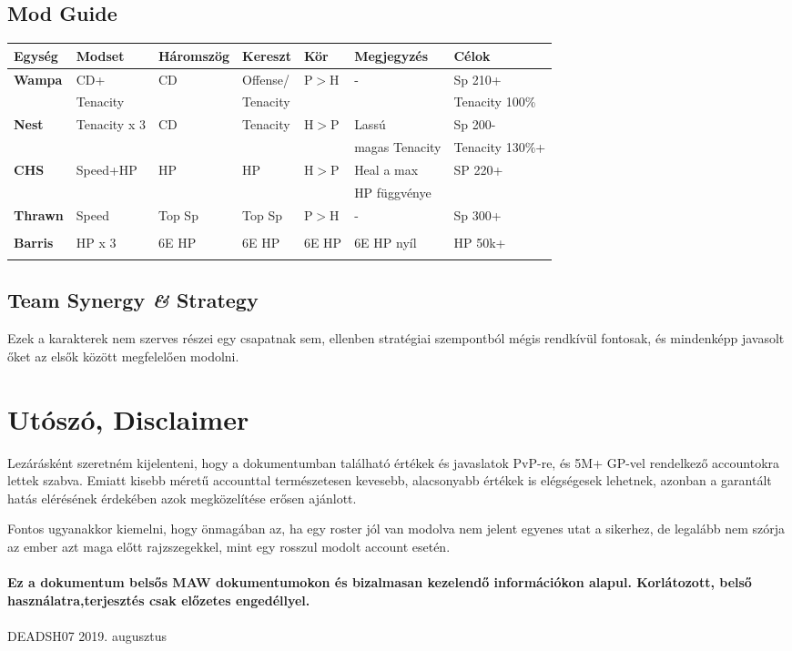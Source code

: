 \documentclass[11pt]{report}
\begin{document}
\section{Mod Guide}
\begin{center}
    \begin{tabular}{|l | l | l | l | l | l | l |}
        \hline
        Egység & Modset & Háromszög & Kereszt & Kör & Megjegyzés & Célok\\ \hline
        \textbf{Wampa} & CD+ & CD & Offense/ & P$>$H & - & Sp 210+\\
        & Tenacity &  & Tenacity &  &  & Tenacity 100\%\\ \hline
        \textbf{Nest} & Tenacity x 3 & CD & Tenacity & H$>$P & Lassú & Sp 200-\\
        &  &  &  &  & magas Tenacity & Tenacity 130\%+\\ \hline
        \textbf{CHS} & Speed+HP & HP & HP & H$>$P & Heal a max & SP 220+\\
        &  &  &  &  & HP függvénye & \\ \hline
        \textbf{Thrawn} & Speed & Top Sp & Top Sp & P$>$H & - & Sp 300+\\
        &  &  &  &  &  & \\ \hline
        \textbf{Barris} & HP x 3 & 6E HP & 6E HP & 6E HP & 6E HP nyíl & HP 50k+\\
        &  &  &  &  &  & \\ \hline
    \end{tabular}
\end{center}
\section{Team Synergy \textit{\&} Strategy}
Ezek a karakterek nem szerves részei egy csapatnak sem, ellenben stratégiai szempontból mégis rendkívül fontosak, és mindenképp javasolt őket az elsők között megfelelően modolni.


\chapter{Utószó, Disclaimer}
Lezárásként szeretném kijelenteni, hogy a dokumentumban található értékek és javaslatok PvP-re, és 5M+ GP-vel rendelkező accountokra lettek szabva. Emiatt kisebb méretű accounttal természetesen kevesebb, alacsonyabb értékek is elégségesek lehetnek, azonban a garantált hatás elérésének érdekében azok megközelítése erősen ajánlott.\par
Fontos ugyanakkor kiemelni, hogy önmagában az, ha egy roster jól van modolva nem jelent egyenes utat a sikerhez, de legalább nem szórja az ember azt maga előtt rajzszegekkel, mint egy rosszul modolt account esetén.\\
\\
\textbf{Ez a dokumentum belsős MAW dokumentumokon és bizalmasan kezelendő információkon alapul. Korlátozott, belső használatra,terjesztés csak előzetes engedéllyel.}\\
\\
\LARGE\textcopyright DEADSH07 2019. augusztus
\end{document}
